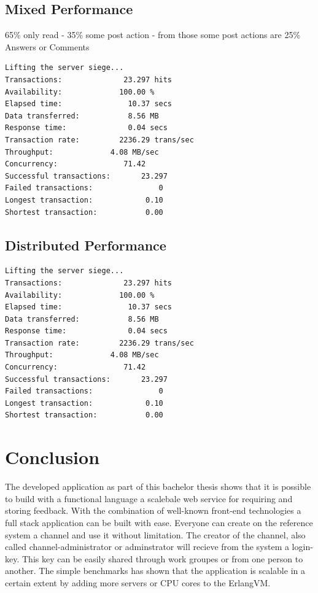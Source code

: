\section{Mixed Performance}
65\% only read - 35\% some post action - from those some post actions are 25\% Answers or Comments
\begin{lstlisting}
Lifting the server siege...
Transactions:		       23.297 hits
Availability:		      100.00 %
Elapsed time:		        10.37 secs
Data transferred:	        8.56 MB
Response time:		        0.04 secs
Transaction rate:	      2236.29 trans/sec
Throughput:		        4.08 MB/sec
Concurrency:		       71.42
Successful transactions:       23.297
Failed transactions:	           0
Longest transaction:	        0.10
Shortest transaction:	        0.00
\end{lstlisting}
\section{Distributed Performance}
\begin{lstlisting}
Lifting the server siege...
Transactions:		       23.297 hits
Availability:		      100.00 %
Elapsed time:		        10.37 secs
Data transferred:	        8.56 MB
Response time:		        0.04 secs
Transaction rate:	      2236.29 trans/sec
Throughput:		        4.08 MB/sec
Concurrency:		       71.42
Successful transactions:       23.297
Failed transactions:	           0
Longest transaction:	        0.10
Shortest transaction:	        0.00
\end{lstlisting}


\chapter{Conclusion}
The developed application as part of this bachelor thesis shows that it is possible to build with a functional language a scalebale web service for requiring and storing feedback. With the combination of well-known front-end technologies a full stack application can be built with ease. 
Everyone can create on the reference system a channel and use it without limitation. The creator of the channel, also called channel-administrator or adminstrator will recieve from the system a login-key. This key can be easily shared through work groupes or from one person to another. 
The simple benchmarks has shown that the application is scalable in a certain extent by adding more servers or CPU cores to the ErlangVM.


\cleardoublepage
\appendixheader

